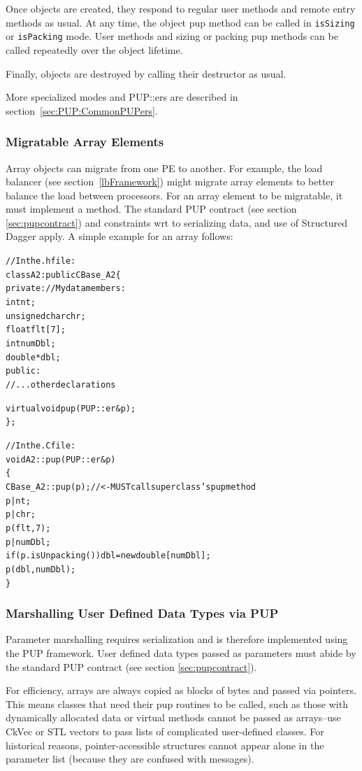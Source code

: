 Once objects are created, they respond to regular user methods
and remote entry methods as usual.  At any time, the object 
pup method can be called in \verb.isSizing. or \verb.isPacking.
mode.  User methods and sizing or packing pup methods can be called
repeatedly over the object lifetime.

Finally, objects are destroyed by calling their destructor
as usual.

More specialized modes and PUP::ers are described in section~\ref{sec:PUP:CommonPUPers}. 

\subsubsection{Migratable Array Elements}

\label{arraymigratable}
Array objects can migrate from one PE to another.  For
example, the load balancer (see section~\ref{lbFramework}) might
migrate array elements to better balance the load between processors.
For an array element to be migratable, it must implement a 
method.  The standard PUP contract (see section \ref{sec:pupcontract})
and constraints wrt to serializing data, and use of Structured Dagger apply.  A simple example for an array follows:

\begin{alltt}
//In the .h file:
class A2 : public CBase\_A2 \{
private: //My data members:
    int nt;
    unsigned char chr;
    float flt[7];
    int numDbl;
    double *dbl;
public:	
    //...other declarations

    virtual void pup(PUP::er \&p);
\};

//In the .C file:
void A2::pup(PUP::er \&p)
\{
    CBase\_A2::pup(p); //<- MUST call superclass's pup method
    p|nt;
    p|chr;
    p(flt,7);
    p|numDbl;
    if (p.isUnpacking()) dbl=new double[numDbl];
    p(dbl,numDbl);
\}
\end{alltt}

\subsubsection{Marshalling User Defined Data Types via PUP}

Parameter marshalling requires serialization and is therefore
implemented using the PUP framework.  User defined data types passed
as parameters must abide by the standard PUP contract (see section
\ref{sec:pupcontract}).

For efficiency, arrays are always copied as blocks of bytes and passed
via pointers.  This means classes that need their pup routines to be
called, such as those with dynamically allocated data or virtual
methods cannot be passed as arrays--use CkVec or STL vectors to pass
lists of complicated user-defined classes.  For historical reasons,
pointer-accessible structures cannot appear alone in the parameter
list (because they are confused with messages).

